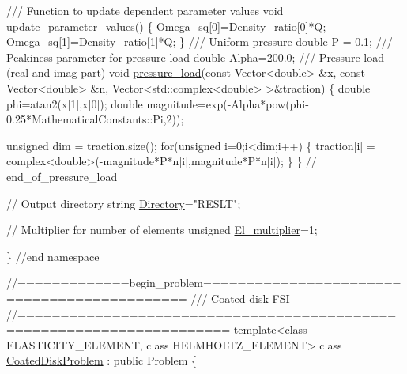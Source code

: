 \begin{DoxyCodeInclude}
 \textcolor{comment}{}
\textcolor{comment}{ /// Function to update dependent parameter values}
\textcolor{comment}{} \textcolor{keywordtype}{void} \hyperlink{namespaceGlobal__Parameters_ae0f9a80fb7510dbfbbef22582da231b7}{update\_parameter\_values}()
 \{
  \hyperlink{namespaceGlobal__Parameters_af9e1e178dfb7f5e35b452599bd4c4324}{Omega\_sq}[0]=\hyperlink{namespaceGlobal__Parameters_a517d4c31b8bce6563c2f605266dd9679}{Density\_ratio}[0]*\hyperlink{namespaceGlobal__Parameters_a7814fddf663e56168174a42d2cd6b4c1}{Q};
  \hyperlink{namespaceGlobal__Parameters_af9e1e178dfb7f5e35b452599bd4c4324}{Omega\_sq}[1]=\hyperlink{namespaceGlobal__Parameters_a517d4c31b8bce6563c2f605266dd9679}{Density\_ratio}[1]*\hyperlink{namespaceGlobal__Parameters_a7814fddf663e56168174a42d2cd6b4c1}{Q};
 \}
\textcolor{comment}{}
\textcolor{comment}{ /// Uniform pressure}
\textcolor{comment}{} \textcolor{keywordtype}{double} P = 0.1;
\textcolor{comment}{}
\textcolor{comment}{ /// Peakiness parameter for pressure load}
\textcolor{comment}{} \textcolor{keywordtype}{double} Alpha=200.0;
\textcolor{comment}{}
\textcolor{comment}{ /// Pressure load (real and imag part)}
\textcolor{comment}{} \textcolor{keywordtype}{void} \hyperlink{namespaceGlobal__Parameters_a0ddb3a77481b907fbb34f2e8d0a6eb9f}{pressure\_load}(\textcolor{keyword}{const} Vector<double> &x,
                    \textcolor{keyword}{const} Vector<double> &n, 
                    Vector<std::complex<double> >&traction)
 \{
  \textcolor{keywordtype}{double} phi=atan2(x[1],x[0]);
  \textcolor{keywordtype}{double} magnitude=exp(-Alpha*pow(phi-0.25*MathematicalConstants::Pi,2));

  \textcolor{keywordtype}{unsigned} dim = traction.size();
  \textcolor{keywordflow}{for}(\textcolor{keywordtype}{unsigned} i=0;i<dim;i++)
   \{
    traction[i] = complex<double>(-magnitude*P*n[i],magnitude*P*n[i]);
   \}
 \} \textcolor{comment}{// end\_of\_pressure\_load}

 \textcolor{comment}{// Output directory}
 \textcolor{keywordtype}{string} \hyperlink{namespaceGlobal__Parameters_a301ab922df72030c660b21328d6caf76}{Directory}=\textcolor{stringliteral}{"RESLT"};
 
 \textcolor{comment}{// Multiplier for number of elements}
 \textcolor{keywordtype}{unsigned} \hyperlink{namespaceGlobal__Parameters_a35d5d2ecfff0cec6150a5dc79e5c1ad1}{El\_multiplier}=1;

\} \textcolor{comment}{//end namespace}



\textcolor{comment}{//=============begin\_problem============================================ }\textcolor{comment}{}
\textcolor{comment}{/// Coated disk FSI}
\textcolor{comment}{}\textcolor{comment}{//====================================================================== }
\textcolor{keyword}{template}<\textcolor{keyword}{class} ELASTICITY\_ELEMENT, \textcolor{keyword}{class} HELMHOLTZ\_ELEMENT>
\textcolor{keyword}{class }\hyperlink{classCoatedDiskProblem}{CoatedDiskProblem} : \textcolor{keyword}{public} Problem
\{


\end{DoxyCodeInclude}
